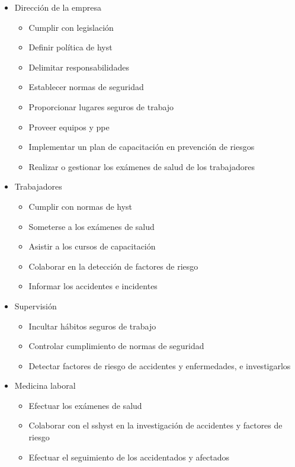 \begin{itemize}
	\item Dirección de la empresa
	      \begin{itemize}
		      \item Cumplir con legislación
		      \item Definir política de \acrfull{hyst}
		      \item Delimitar responsabilidades
		      \item Establecer normas de seguridad
		      \item Proporcionar lugares seguros de trabajo
		      \item Proveer equipos y \acrfull{ppe}
		      \item Implementar un plan de capacitación en prevención de riesgos
		      \item Realizar o gestionar los exámenes de salud de los
		            trabajadores
	      \end{itemize}
	\item Trabajadores
	      \begin{itemize}
		      \item Cumplir con normas de \acrshort{hyst}
		      \item Someterse a los exámenes de salud
		      \item Asistir a los cursos de capacitación
		      \item Colaborar en la detección de factores de riesgo
		      \item Informar los accidentes e incidentes
	      \end{itemize}
	\item Supervisión
	      \begin{itemize}
		      \item Incultar hábitos seguros de trabajo
		      \item Controlar cumplimiento de normas de seguridad
		      \item Detectar factores de riesgo de accidentes y enfermedades, e
		            investigarlos
	      \end{itemize}
	\item Medicina laboral
	      \begin{itemize}
		      \item Efectuar los exámenes de salud
		      \item Colaborar con el \acrfull{sshyst} en la investigación de
		            accidentes y factores de riesgo
		      \item Efectuar el seguimiento de los accidentados y afectados

\end{itemize}
\end{itemize}
